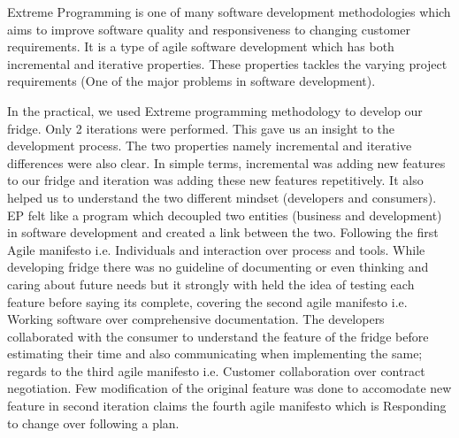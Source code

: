 \documentclass[12pt]{article}
\begin{document}
Extreme Programming is one of many software development methodologies which aims to improve software quality and responsiveness to changing customer requirements. It is a type of agile software development which has both incremental and iterative properties. These properties tackles the varying project requirements (One of the major problems in software development). 

In the practical, we used Extreme programming methodology to develop our fridge. Only 2 iterations were performed. This gave us an insight to the development process. The two properties namely incremental and iterative differences were also clear. In simple terms, incremental was adding new features to our fridge and iteration was adding these new features repetitively. It  also helped us to understand the two different mindset (developers and consumers). EP felt like a program which decoupled two entities (business and development) in software development and created a link between the two. Following the first Agile manifesto i.e. Individuals and interaction over process and tools. While developing fridge there was no guideline of documenting or even thinking and caring about future needs but it strongly with held the idea of testing each feature before saying its complete, covering the second agile manifesto i.e. Working software over comprehensive documentation. The developers collaborated with the consumer to understand the feature of the fridge before estimating their time and also communicating when implementing the same; regards to the third agile manifesto i.e. Customer collaboration over contract negotiation. Few modification of the original feature was done to accomodate new feature in second iteration claims the fourth agile manifesto which is Responding to change over following a plan.
\end{document}
